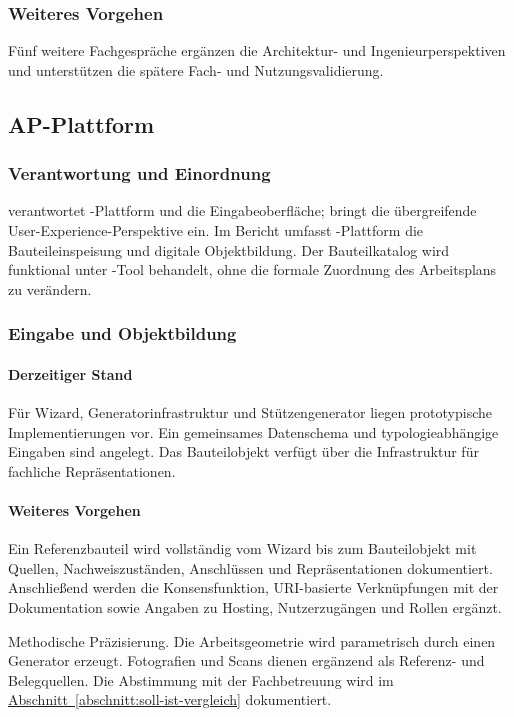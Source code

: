 \documentclass[type=zwischenbericht]{zukunftbau}
\begin{document}
\subsubsection{Weiteres Vorgehen}
Fünf weitere Fachgespräche ergänzen die Architektur- und Ingenieurperspektiven und unterstützen die spätere Fach- und Nutzungsvalidierung.

\subsection{AP-Plattform}

\subsubsection{Verantwortung und Einordnung}
 verantwortet -Plattform und die Eingabeoberfläche;  bringt die übergreifende User-Experience-Perspektive ein. Im Bericht umfasst -Plattform die Bauteileinspeisung und digitale Objektbildung. Der Bauteilkatalog wird funktional unter -Tool behandelt, ohne die formale Zuordnung des Arbeitsplans zu verändern.

\subsubsection{Eingabe und Objektbildung}

\paragraph{Derzeitiger Stand}
Für Wizard, Generatorinfrastruktur und Stützengenerator liegen prototypische Implementierungen vor. Ein gemeinsames Datenschema und typologieabhängige Eingaben sind angelegt. Das Bauteilobjekt verfügt über die Infrastruktur für fachliche Repräsentationen.

\paragraph{Weiteres Vorgehen}
Ein Referenzbauteil wird vollständig vom Wizard bis zum Bauteilobjekt mit Quellen, Nachweiszuständen, Anschlüssen und Repräsentationen dokumentiert. Anschließend werden die Konsensfunktion, URI-basierte Verknüpfungen mit der Dokumentation sowie Angaben zu Hosting, Nutzerzugängen und Rollen ergänzt.

Methodische Präzisierung. Die Arbeitsgeometrie wird parametrisch durch einen Generator erzeugt. Fotografien und Scans dienen ergänzend als Referenz- und Belegquellen. Die Abstimmung mit der Fachbetreuung wird im \hyperref[abschnitt:soll-ist-vergleich]{Abschnitt~\ref*{abschnitt:soll-ist-vergleich}} dokumentiert.
\end{document}
